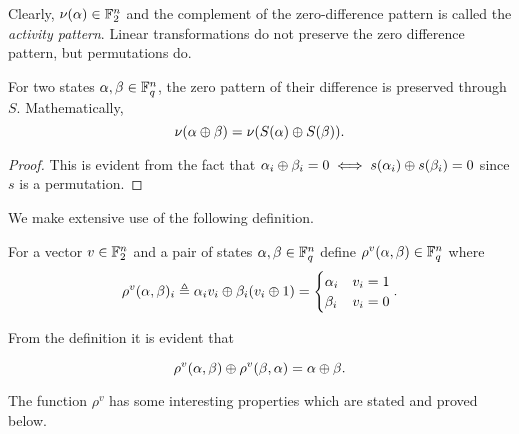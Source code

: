 \documentclass[twoside]{article}
\begin{document}
Clearly, \(\nu(\alpha) \in \mathbb F_2^n\) and the complement of the
zero-difference pattern is called the \emph{activity pattern}. Linear
transformations do not preserve the zero difference pattern, but permutations
do.

\begin{lemma}
    \label{lem:zero-diff-perm}
    For two states \(\alpha, \beta \in \mathbb F_q^n\), the zero pattern of their
    difference is preserved through \(S\). Mathematically,
    \begin{equation}
        \nu(\alpha \oplus \beta) = \nu(S(\alpha) \oplus S(\beta)).
        \label{eq:zero-diff-perm}
    \end{equation}
\end{lemma}
\begin{proof}
    This is evident from the fact that \(\alpha_i \oplus \beta_i = 0 \iff
    s(\alpha_i) \oplus s(\beta_i) = 0\) since \(s\) is a permutation.
\end{proof}

We make extensive use of the following definition.

\begin{definition}
    \label{def:rho-v}
    For a vector \(v \in \mathbb F_2^n\) and a pair of states \(\alpha, \beta \in
    \mathbb F_q^n\) define \(\rho^v(\alpha, \beta) \in \mathbb F_q^n\) where
    \begin{equation}
        \rho^v(\alpha, \beta)_i \triangleq \alpha_iv_i \oplus \beta_i(v_i \oplus 1) =
        \begin{cases}
            \alpha_i & v_i = 1 \\
            \beta_i & v_i = 0
        \end{cases}.
        \label{eq:rho-v-def}
    \end{equation}
\end{definition}

From the definition it is evident that

\begin{equation}
    \rho^v(\alpha, \beta) \oplus \rho^v(\beta, \alpha) = \alpha \oplus \beta.
    \label{eq:rho-xor}
\end{equation}

The function \(\rho^v\) has some interesting properties which are stated and
proved below.
\end{document}

